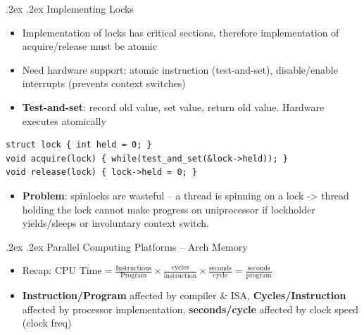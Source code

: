 \documentclass[10pt,landscape,a4paper]{article}
\makeatletter
\renewcommand{\section}{\@startsection{section}{1}{0mm}%
  {.2ex}%
  {.2ex}%
{\color{myblue}\sffamily\small\bfseries}}
\renewcommand{\subsection}{\@startsection{subsection}{1}{0mm}%
  {.2ex}%
  {.2ex}%
{\sffamily\bfseries}}
\makeatother
\begin{document}
\begin{multicols*}{4}
  \subsection{Implementing Locks}
  \begin{itemize}
    \item Implementation of locks has critical sections, therefore implementation of acquire/release must be atomic
    \item Need hardware support: atomic instruction (test-and-set), disable/enable interrupts (prevents context switches)
    \item \textbf{Test-and-set}: record old value, set value, return old value. Hardware executes atomically
  \end{itemize}
  \begin{verbatim}
struct lock { int held = 0; }
void acquire(lock) { while(test_and_set(&lock->held)); }
void release(lock) { lock->held = 0; }
  \end{verbatim}
  \begin{itemize}
    \item \textbf{Problem}: spinlocks are wasteful -- a thread is spinning on a lock -> thread holding the lock cannot make progress on uniprocessor if lockholder yields/sleeps or involuntary context switch.
  \end{itemize}
  \section{Parallel Computing Platforms -- Arch Memory}
  \begin{itemize}
    \item Recap: $\text{CPU Time} = \frac{\text{Instructions}}{\text{Program}}\times\frac{\text{cycles}}{\text{instruction}}\times\frac{\text{seconds}}{\text{cycle}} = \frac{\text{seconds}}{\text{program}}$
    \item \textbf{Instruction/Program} affected by compiler \& ISA, \textbf{Cycles/Instruction} affected by processor implementation, \textbf{seconds/cycle} affected by clock speed (clock freq)
  \end{itemize}

\end{multicols*}
\end{document}
